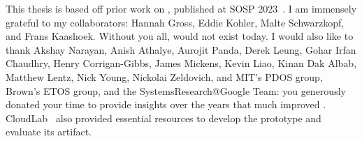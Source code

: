 
%
This thesis is based off prior work on \sys, published at SOSP 2023~\cite{edna}.
I am immensely grateful to my collaborators: Hannah Gross, Eddie Kohler, Malte
Schwarzkopf, and Frans Kaashoek. Without you all, \sys would not exist today.
%
I would also like to thank Akshay Narayan, Anish Athalye, Aurojit Panda, Derek
Leung, Gohar Irfan Chaudhry, Henry Corrigan-Gibbs, James Mickens, Kevin Liao,
Kinan Dak Albab, Matthew Lentz, Nick Young, Nickolai Zeldovich, and MIT's PDOS
group, Brown's ETOS group, and the SystemsResearch@Google Team: you generously
donated your time to provide insights over the years that much improved \sys. 
%
CloudLab~\cite{cloudlab} also provided essential resources to develop the \sys prototype
and evaluate its artifact.
%
%
%
%

\begin{comment}
**Family**
Stephanie ("Stephie")
Parents (Phaih-lan Law, Kenwood Tsai)
Ah-ma and Ah-gong Tsai
Cecilia and Jacek Smolinski
Jackie and Kenny Smolinski
Ah-Ee (and my goddogs, Toby and Sparky)
Wei-Jen
Wei-Ken
Ah-ma and Ah-gong Lau

**Family++**
Benji Kilimnik
Trevor Hohn

**Researchers**
Akshay Narayan, Anish Athalye, Derek Leung, Gohar Irfan Chaudhry, Henry
Corrigan-Gibbs, James Mickens, Kevin Liao, Kinan Dak Albab, Matthew Lentz,
Nickolai Zeldovich, and the anonymous reviewers 

Hannah Gross
Nick Young 

MIT's PDOS group, Brown's ETOS group, and
the SystemsResearch@Google Team 

Health team
\end{comment}
